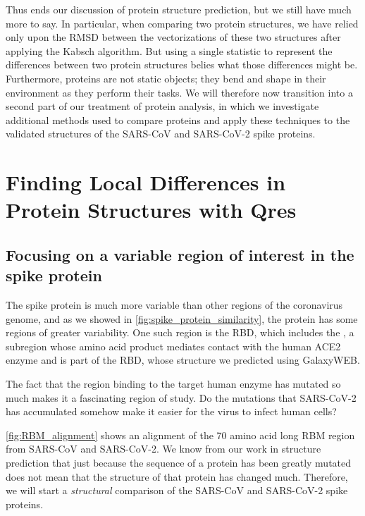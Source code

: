 Thus ends our discussion of protein structure prediction, but we still have much more to say. In particular, when comparing two protein structures, we have relied only upon the RMSD between the vectorizations of these two structures after applying the Kabsch algorithm. But using a single statistic to represent the differences between two protein structures belies what those differences might be. Furthermore, proteins are not static objects; they bend and shape in their environment as they perform their tasks. We will therefore now transition into a second part of our treatment of protein analysis, in which we investigate additional methods used to compare proteins and apply these techniques to the validated structures of the SARS-CoV and SARS-CoV-2 spike proteins.\\

\FloatBarrier
{}

\section{Finding Local Differences in Protein Structures with Qres}
\label{sec:multiseq}

\FloatBarrier
{}
\subsection{Focusing on a variable region of interest in the spike protein}

The spike protein is much more variable than other regions of the coronavirus genome, and as we showed in \autoref{fig:spike_protein_similarity}, the protein has some regions of greater variability.  One such region is the RBD, which includes the , a subregion whose amino acid product mediates contact with the human ACE2 enzyme and is part of the RBD, whose structure we predicted using GalaxyWEB.

The fact that the region binding to the target human enzyme has mutated so much makes it a fascinating region of study. Do the mutations that SARS-CoV-2 has accumulated somehow make it easier for the virus to infect human cells?

\autoref{fig:RBM_alignment} shows an alignment of the 70 amino acid long RBM region from SARS-CoV and SARS-CoV-2. We know from our work in structure prediction that just because the sequence of a protein has been greatly mutated does not mean that the structure of that protein has changed much. Therefore, we will start a \textit{structural} comparison of the SARS-CoV and SARS-CoV-2 spike proteins.

